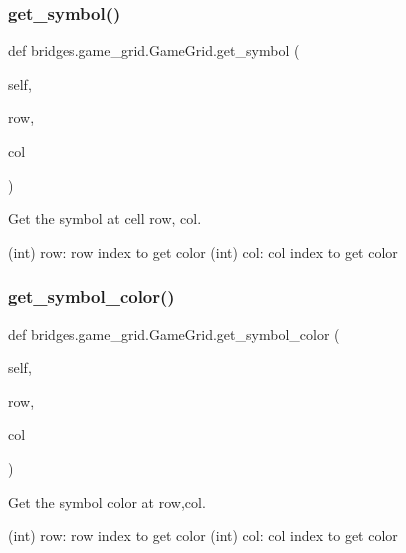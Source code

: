 \subsubsection{\texorpdfstring{get\_symbol()}{get\_symbol()}}
{\footnotesize\ttfamily def bridges.\+game\+\_\+grid.\+Game\+Grid.\+get\+\_\+symbol (\begin{DoxyParamCaption}\item[{}]{self,  }\item[{int}]{row,  }\item[{int}]{col }\end{DoxyParamCaption})}



Get the symbol at cell row, col. 

\begin{DoxyVerb}       (int) row: row index to get color
       (int) col: col index to get color
\end{DoxyVerb}
 \mbox{\label{classbridges_1_1game__grid_1_1_game_grid_a7324c15bc6983621ed84964dde173f7f}} 
\subsubsection{\texorpdfstring{get\_symbol\_color()}{get\_symbol\_color()}}
{\footnotesize\ttfamily def bridges.\+game\+\_\+grid.\+Game\+Grid.\+get\+\_\+symbol\+\_\+color (\begin{DoxyParamCaption}\item[{}]{self,  }\item[{}]{row,  }\item[{}]{col }\end{DoxyParamCaption})}



Get the symbol color at row,col. 

\begin{DoxyVerb}       (int) row: row index to get color
       (int) col: col index to get color
\end{DoxyVerb}
 \mbox{\label{classbridges_1_1game__grid_1_1_game_grid_a54a27dd797ab47d03d2f98b8f3e319c1}} 
